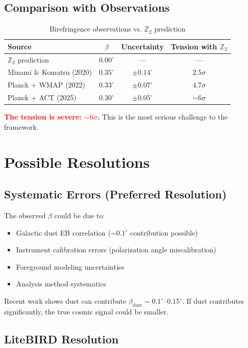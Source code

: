 \documentclass[12pt,a4paper]{article}
\begin{document}
\subsection{Comparison with Observations}

\begin{table}[h]
\centering
\begin{tabular}{lccc}
\toprule
Source & $\beta$ & Uncertainty & Tension with $\mathbb{Z}_2$ \\
\midrule
$\mathbb{Z}_2$ prediction & $0.00^\circ$ & --- & --- \\
Minami \& Komatsu (2020) & $0.35^\circ$ & $\pm 0.14^\circ$ & $2.5\sigma$ \\
Planck + WMAP (2022) & $0.33^\circ$ & $\pm 0.07^\circ$ & $4.7\sigma$ \\
Planck + ACT (2025) & $0.30^\circ$ & $\pm 0.05^\circ$ & $\sim 6\sigma$ \\
\bottomrule
\end{tabular}
\caption{Birefringence observations vs. $\mathbb{Z}_2$ prediction}
\end{table}

\textcolor{red}{\textbf{The tension is severe: $\sim 6\sigma$.}} This is the most serious challenge to the framework.

\section{Possible Resolutions}

\subsection{Systematic Errors (Preferred Resolution)}

The observed $\beta$ could be due to:
\begin{itemize}
    \item Galactic dust EB correlation ($\sim 0.1^\circ$ contribution possible)
    \item Instrument calibration errors (polarization angle miscalibration)
    \item Foreground modeling uncertainties
    \item Analysis method systematics
\end{itemize}

Recent work shows dust can contribute $\beta_{\text{dust}} \sim 0.1^\circ$--$0.15^\circ$. If dust contributes significantly, the true cosmic signal could be smaller.

\subsection{LiteBIRD Resolution}
\end{document}
